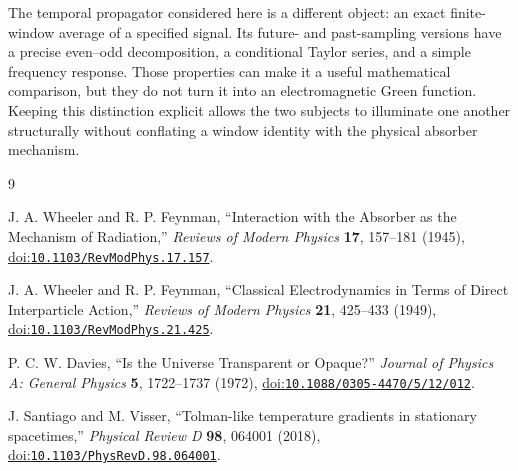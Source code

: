\documentclass[12pt]{article}
\begin{document}
The temporal propagator considered here is a different object: an exact finite-window average of a specified signal. Its future- and past-sampling versions have a precise even--odd decomposition, a conditional Taylor series, and a simple frequency response. Those properties can make it a useful mathematical comparison, but they do not turn it into an electromagnetic Green function. Keeping this distinction explicit allows the two subjects to illuminate one another structurally without conflating a window identity with the physical absorber mechanism.

\begin{thebibliography}{9}
\small
{}
\raggedright
{}

J. A. Wheeler and R. P. Feynman,
``Interaction with the Absorber as the Mechanism of Radiation,''
\emph{Reviews of Modern Physics} \textbf{17}, 157--181 (1945),
\href{https://doi.org/10.1103/RevModPhys.17.157}{doi:\nolinkurl{10.1103/RevModPhys.17.157}}.

J. A. Wheeler and R. P. Feynman,
``Classical Electrodynamics in Terms of Direct Interparticle Action,''
\emph{Reviews of Modern Physics} \textbf{21}, 425--433 (1949),
\href{https://doi.org/10.1103/RevModPhys.21.425}{doi:\nolinkurl{10.1103/RevModPhys.21.425}}.

P. C. W. Davies,
``Is the Universe Transparent or Opaque?''
\emph{Journal of Physics A: General Physics} \textbf{5}, 1722--1737 (1972),
\href{https://doi.org/10.1088/0305-4470/5/12/012}{doi:\nolinkurl{10.1088/0305-4470/5/12/012}}.

J. Santiago and M. Visser,
``Tolman-like temperature gradients in stationary spacetimes,''
\emph{Physical Review D} \textbf{98}, 064001 (2018),
\href{https://doi.org/10.1103/PhysRevD.98.064001}{doi:\nolinkurl{10.1103/PhysRevD.98.064001}}.


\end{thebibliography}
\end{document}
